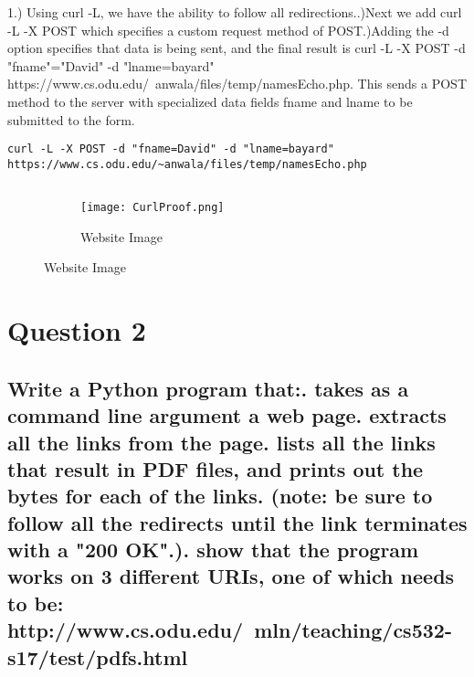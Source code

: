\documentclass[11pt]{scrartcl} %
\begin{document}
1.) Using curl -L, we have the ability to follow all redirections.\newline {}.)Next we add curl -L -X POST which specifies a custom request method of POST\newline {}.)Adding the -d option specifies that data is being sent, and the final result is \newline  curl -L -X POST -d "fname"="David" -d "lname=bayard" https://www.cs.odu.edu/~anwala/files/temp/namesEcho.php. \newline \newline
This sends a POST method to the server with specialized data fields fname and lname to be submitted to the form.

\begin{lstlisting}[caption=Curl Command]
 curl -L -X POST -d "fname=David" -d "lname=bayard" https://www.cs.odu.edu/~anwala/files/temp/namesEcho.php


\end{lstlisting}


\begin{figure}[h!]
  \centering
  \begin{subfigure}[b]{1.1\linewidth}
    \texttt{[image: CurlProof.png]}
    \caption{Website Image}
  \end{subfigure}
\end{figure}

%
\pagebreak
\section*{Question 2}\bigskip

\subsection*{Write a Python program that:. takes as a command line argument a web page. extracts all the links from the page. lists all the links that result in PDF files, and prints out
     the bytes for each of the links.  (note: be sure to follow
     all the redirects until the link terminates with a "200 OK".). show that the program works on 3 different URIs, one of which
     needs to be: 
     http://www.cs.odu.edu/~mln/teaching/cs532-s17/test/pdfs.html}
\end{document}
